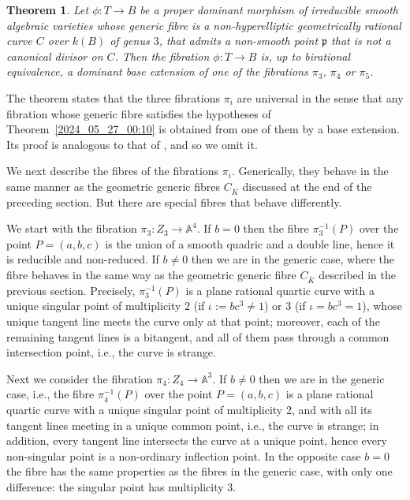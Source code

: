 \documentclass[12pt,reqno]{amsart}
\newtheorem{thm}{Theorem}[section]
\theoremstyle{definition}
\newcommand{\ov}{\overline}
\newcommand{\AAA}{\mathbb{A}}
\newcommand{\pp}{\mathfrak{p}}
\begin{document}
\begin{thm}\label{2024_05_29_21:05}
Let $\phi : T \to B$ be a proper dominant morphism of irreducible smooth
algebraic varieties whose generic fibre is a non-hyperelliptic geometrically rational curve $C$ over $k(B)$ of genus $3$, that admits a non-smooth point $\pp$ that is not a canonical divisor on $C$. 
Then the fibration $\phi : T \to B$ is, up to birational equivalence, a dominant base extension of one of the fibrations $\pi_3$, $\pi_4$ or $\pi_5$.
\end{thm}

The theorem states that the three fibrations $\pi_i$ are universal in the sense that any fibration whose generic fibre satisfies the hypotheses of  Theorem~\ref{2024_05_27_00:10} is obtained from one of them by a base extension.
Its proof is analogous to that of \cite[Theorem~5.1]{HiSt23}, and so we omit it.

We next describe the fibres of the fibrations $\pi_i$. 
Generically, they behave in the same manner as the geometric generic fibres $C_{\ov K}$ discussed at the end of the preceding section. But there are special fibres that behave differently.

We start with the fibration $\pi_3:Z_3\to \AAA^4$.
If $b=0$ then the fibre $\pi_3^{-1}(P)$ over the point $P=(a,b,c)$ is the union of a smooth quadric and a double line, hence it is reducible and non-reduced.
If $b\neq0$ then we are in the generic case, where the fibre behaves in the same way as the geometric generic fibre $C_{\ov K}$ described in the previous section. 
Precisely, $\pi_3^{-1}(P)$ is a plane rational quartic curve with a unique singular point of multiplicity 2 (if $\iota := b c^3 \neq 1$) or 3 (if $\iota = b c^3 = 1$), 
whose unique tangent line meets the curve only at that point; moreover, each of the remaining tangent lines is a bitangent, and all of them pass through a common intersection point, i.e., the curve is strange.

Next we consider the fibration $\pi_4:Z_4\to \AAA^3$.
If $b\neq 0$ then we are in the generic case, i.e., the fibre $\pi_4^{-1}(P)$ over the point $P=(a,b,c)$ is a plane rational quartic curve with a unique singular point of multiplicity 2, and with all its tangent lines meeting in a unique common point, i.e., the curve is strange; in addition, every tangent line intersects the curve at a unique point, hence every non-singular point is a non-ordinary inflection point.
In the opposite case $b=0$ the fibre has the same properties as the fibres in the generic case, with only one difference: the singular point has multiplicity 3.
\end{document}
